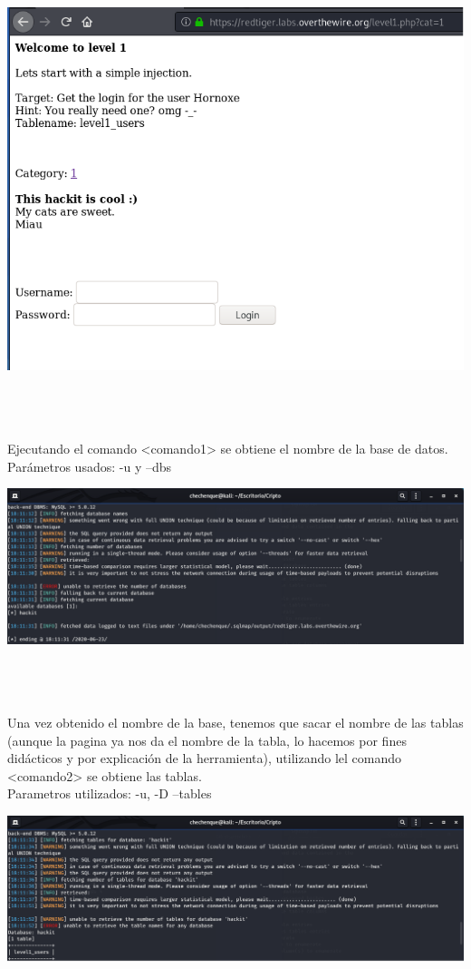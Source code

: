 \documentclass[11pt,letterpaper]{article}
\begin{document}
\begin{center}
\includegraphics[scale=.6]{./Img/sqlmap1.png}
\end{center}~\\~\\~\\
Ejecutando el comando <comando1> se obtiene el nombre de la base de datos.\\
Parámetros usados: -u y --dbs
\begin{center}
\includegraphics[scale=.5]{./Img/sqlmap2.png}
\end{center}~\\~\\~\\
Una vez obtenido el nombre de la base, tenemos que sacar el nombre de las tablas (aunque la pagina ya nos da el nombre de la tabla, lo hacemos por fines didácticos y por explicación de la herramienta), utilizando lel comando <comando2> se obtiene las tablas.\\
Parametros utilizados: -u, -D --tables\\
\begin{center}
\includegraphics[scale=.5]{./Img/sqlmap3.png}
\end{center}~\\~\\~\\
\end{document}
